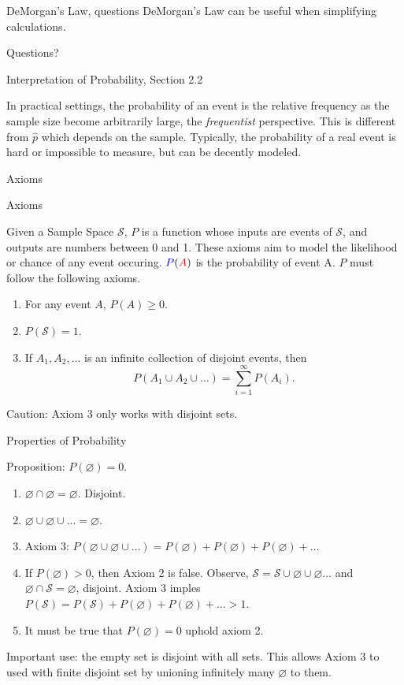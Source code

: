 \documentclass{beamer}
\newcommand{\blue}[1]{{\color{blue} #1}}
\newcommand{\red}[1]{{\color{red} #1}}
\newcommand{\qtns}[0]{\begin{center} Questions? \end{center}}
\let\emptyset\varnothing
\newcommand{\SampS}[0]{$\mathcal{S}$}
\begin{document}
\begin{frame}{DeMorgan's Law, questions}
    DeMorgan's Law can be useful when simplifying calculations.

    \qtns
\end{frame}

\begin{frame}{Interpretation of Probability, Section 2.2}

    In practical settings, the probability of an event is the relative frequency as the sample size become arbitrarily large, the \textit{frequentist} perspective. This is different from $\hat{p}$ which depends on the sample. Typically, the probability of a real event is hard or impossible to measure, but can be decently modeled.
\end{frame}

\begin{frame}{Axioms}

    \begin{center}
        Axioms
    \end{center}
    Given a Sample Space \SampS, $P$ is a function whose inputs are events of \SampS, and outputs are numbers between 0 and 1. These axioms aim to model the likelihood or chance of any event occuring. $\blue{P}(\red{A})$ is the \blue{probability} of \red{event A}. $P$ must follow the following axioms.
    \begin{enumerate}
        \item For any event $A$, $P(A) \geq 0$.
        \item $P(\mathcal{S})=1$.
        \item If $A_1, A_2, \ldots $ is an infinite collection of disjoint events, then
              \[P(A_1 \cup A_2 \cup \ldots) = \sum_{i=1}^\infty P(A_i).\]
    \end{enumerate}
    Caution: Axiom 3 only works with disjoint sets.
\end{frame}

\begin{frame}{Properties of Probability}

    Proposition: $P(\emptyset) = 0$.
    \begin{enumerate}
        \item $\emptyset \cap \emptyset = \emptyset$. Disjoint.
        \item $\emptyset \cup \emptyset \cup \ldots = \emptyset$.
        \item Axiom 3: $P(\emptyset \cup \emptyset \cup \ldots) = P(\emptyset) + P(\emptyset) + P(\emptyset) + \ldots$
        \item If $P(\emptyset) > 0$, then Axiom 2 is false. Observe, $\mathcal{S} = \mathcal{S} \cup \emptyset \cup \emptyset \ldots$ and $\emptyset\cap \mathcal{S} = \emptyset$, disjoint. Axiom 3 imples $P(\mathcal{S}) = P(\mathcal{S}) + P(\emptyset) + P(\emptyset) + \ldots > 1$.
        \item It must be true that $P(\emptyset)=0$ uphold axiom 2.
    \end{enumerate}
    Important use: the empty set is disjoint with all sets. This allows Axiom 3 to used with finite disjoint set by unioning infinitely many $\emptyset$ to them.

\end{frame}
\end{document}
